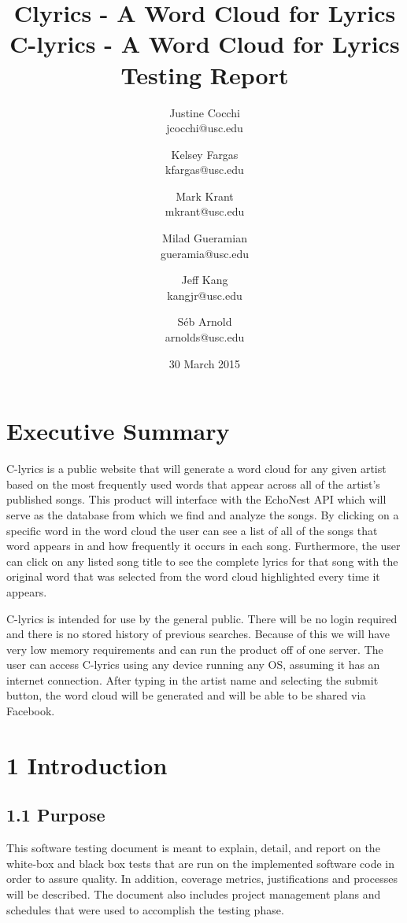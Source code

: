 \documentclass[]{article}
\title{Clyrics - A Word Cloud for Lyrics}
\author{Justine Cocchi\\jcocchi@usc.edu \and Kelsey Fargas\\kfargas@usc.edu \and Mark Krant \\ mkrant@usc.edu\and Milad Gueramian\\gueramia@usc.edu \and Jeff Kang\\kangjr@usc.edu \and Séb Arnold\\arnolds@usc.edu}
\date{30 March 2015}
\title{%
	C-lyrics - A Word Cloud for Lyrics \\
	\large Testing Report}
\begin{document}
\clearpage\maketitle
\thispagestyle{empty}

\pagebreak

\tableofcontents
\setcounter{tocdepth}{3}
\thispagestyle{empty}

\pagebreak

\section{Executive Summary}\label{executive-summary}

C-lyrics is a public website that will generate a word cloud for any
given artist based on the most frequently used words that appear across
all of the artist's published songs. This product will interface with
the EchoNest API which will serve as the database from which we find and
analyze the songs. By clicking on a specific word in the word cloud the
user can see a list of all of the songs that word appears in and how
frequently it occurs in each song. Furthermore, the user can click on
any listed song title to see the complete lyrics for that song with the
original word that was selected from the word cloud highlighted every
time it appears.

C-lyrics is intended for use by the general public. There will be no
login required and there is no stored history of previous searches.
Because of this we will have very low memory requirements and can run
the product off of one server. The user can access C-lyrics using any
device running any OS, assuming it has an internet connection. After
typing in the artist name and selecting the submit button, the word
cloud will be generated and will be able to be shared via Facebook.

\pagebreak

\section{1 Introduction}\label{introduction}

\subsection{1.1 Purpose}\label{purpose}

This software testing document is meant to explain, detail, and report
on the white-box and black box tests that are run on the implemented
software code in order to assure quality. In addition, coverage metrics,
justifications and processes will be described. The document also
includes project management plans and schedules that were used to
accomplish the testing phase.
\end{document}
